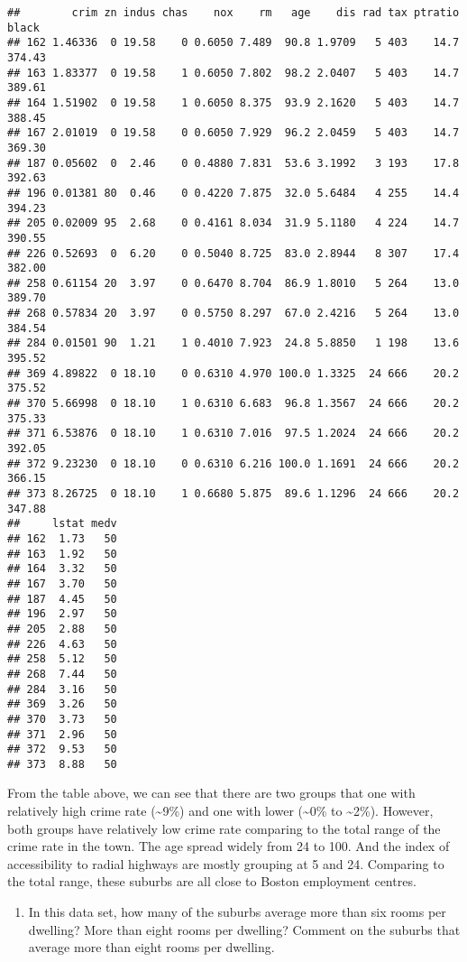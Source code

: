 \documentclass[]{article}
\providecommand{\tightlist}{%
  \setlength{\itemsep}{0pt}\setlength{\parskip}{0pt}}
\begin{document}
\begin{verbatim}
##        crim zn indus chas    nox    rm   age    dis rad tax ptratio  black
## 162 1.46336  0 19.58    0 0.6050 7.489  90.8 1.9709   5 403    14.7 374.43
## 163 1.83377  0 19.58    1 0.6050 7.802  98.2 2.0407   5 403    14.7 389.61
## 164 1.51902  0 19.58    1 0.6050 8.375  93.9 2.1620   5 403    14.7 388.45
## 167 2.01019  0 19.58    0 0.6050 7.929  96.2 2.0459   5 403    14.7 369.30
## 187 0.05602  0  2.46    0 0.4880 7.831  53.6 3.1992   3 193    17.8 392.63
## 196 0.01381 80  0.46    0 0.4220 7.875  32.0 5.6484   4 255    14.4 394.23
## 205 0.02009 95  2.68    0 0.4161 8.034  31.9 5.1180   4 224    14.7 390.55
## 226 0.52693  0  6.20    0 0.5040 8.725  83.0 2.8944   8 307    17.4 382.00
## 258 0.61154 20  3.97    0 0.6470 8.704  86.9 1.8010   5 264    13.0 389.70
## 268 0.57834 20  3.97    0 0.5750 8.297  67.0 2.4216   5 264    13.0 384.54
## 284 0.01501 90  1.21    1 0.4010 7.923  24.8 5.8850   1 198    13.6 395.52
## 369 4.89822  0 18.10    0 0.6310 4.970 100.0 1.3325  24 666    20.2 375.52
## 370 5.66998  0 18.10    1 0.6310 6.683  96.8 1.3567  24 666    20.2 375.33
## 371 6.53876  0 18.10    1 0.6310 7.016  97.5 1.2024  24 666    20.2 392.05
## 372 9.23230  0 18.10    0 0.6310 6.216 100.0 1.1691  24 666    20.2 366.15
## 373 8.26725  0 18.10    1 0.6680 5.875  89.6 1.1296  24 666    20.2 347.88
##     lstat medv
## 162  1.73   50
## 163  1.92   50
## 164  3.32   50
## 167  3.70   50
## 187  4.45   50
## 196  2.97   50
## 205  2.88   50
## 226  4.63   50
## 258  5.12   50
## 268  7.44   50
## 284  3.16   50
## 369  3.26   50
## 370  3.73   50
## 371  2.96   50
## 372  9.53   50
## 373  8.88   50
\end{verbatim}

From the table above, we can see that there are two groups that one with
relatively high crime rate (\textasciitilde{}9\%) and one with lower
(\textasciitilde{}0\% to \textasciitilde{}2\%). However, both groups
have relatively low crime rate comparing to the total range of the crime
rate in the town. The age spread widely from 24 to 100. And the index of
accessibility to radial highways are mostly grouping at 5 and 24.
Comparing to the total range, these suburbs are all close to Boston
employment centres.

\begin{enumerate}
\def\labelenumi{(\alph{enumi})}
\setcounter{enumi}{7}
\tightlist
\item
  In this data set, how many of the suburbs average more than six rooms
  per dwelling? More than eight rooms per dwelling? Comment on the
  suburbs that average more than eight rooms per dwelling.
\end{enumerate}
\end{document}
